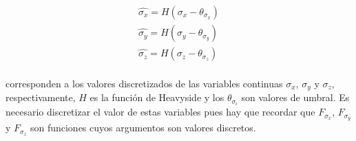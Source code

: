 \begin{eqnarray}
	\widehat{\sigma_x} = H(\sigma_x - \theta_{\sigma_x}) \\
	\widehat{\sigma_y} = H(\sigma_y - \theta_{\sigma_y}) \\
	\widehat{\sigma_z} = H(\sigma_z - \theta_{\sigma_z})
\end{eqnarray}
\\
corresponden a los valores discretizados de las variables continuas $\sigma_x$, $\sigma_y$ y $\sigma_z$, respectivamente, $H$ es la función de Heavyside y los $\theta_{\sigma_i}$ son valores de umbral. Es necesario discretizar el valor de estas variables pues hay que recordar que $F_{\sigma_x}$, $F_{\sigma_y}$ y $F_{\sigma_z}$ son funciones cuyos argumentos son valores discretos.




%
%
%  

